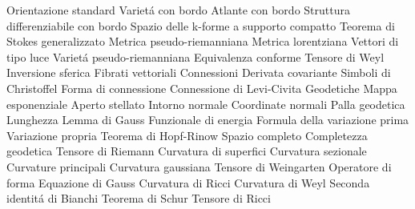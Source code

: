 Orientazione standard
Variet\'a con bordo
Atlante con bordo
Struttura differenziabile con bordo
Spazio delle k-forme a supporto compatto
Teorema di Stokes generalizzato
Metrica pseudo-riemanniana
Metrica lorentziana
Vettori di tipo luce
Variet\'a pseudo-riemanniana
Equivalenza conforme
Tensore di Weyl
Inversione sferica
Fibrati vettoriali
Connessioni
Derivata covariante
Simboli di Christoffel
Forma di connessione
Connessione di Levi-Civita
Geodetiche
Mappa esponenziale
Aperto stellato
Intorno normale
Coordinate normali
Palla geodetica
Lunghezza
Lemma di Gauss
Funzionale di energia
Formula della variazione prima
Variazione propria
Teorema di Hopf-Rinow
Spazio completo
Completezza geodetica
Tensore di Riemann
Curvatura di superfici
Curvatura sezionale
Curvature principali
Curvatura gaussiana
Tensore di Weingarten
Operatore di forma
Equazione di Gauss
Curvatura di Ricci
Curvatura di Weyl
Seconda identit\'a di Bianchi
Teorema di Schur
Tensore di Ricci


